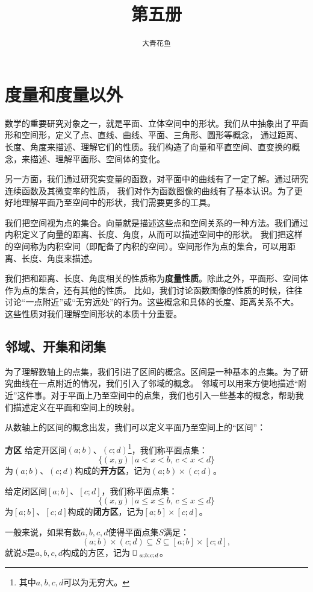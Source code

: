 \documentclass[12pt,UTF8]{ctexbook}
\title{\zihao{0} \bfseries 第五册}
\author{\zihao{2} \texttt{大青花鱼}}
\date{}
\begin{document}
\maketitle
\tableofcontents
\newpage

\chapter{度量和度量以外}

数学的重要研究对象之一，就是平面、立体空间中的形状。我们从中抽象出了平面形和空间形，定义了点、直线、曲线、平面、三角形、圆形等概念，
通过距离、长度、角度来描述、理解它们的性质。我们构造了向量和平直空间、直变换的概念，来描述、理解平面形、空间体的变化。

另一方面，我们通过研究实变量的函数，对平面中的曲线有了一定了解。通过研究连续函数及其微变率的性质，
我们对作为函数图像的曲线有了基本认识。为了更好地理解平面乃至空间中的形状，我们需要更多的工具。

我们把空间视为点的集合。向量就是描述这些点和空间关系的一种方法。我们通过内积定义了向量的距离、长度、角度，从而可以描述空间中的形状。
我们把这样的空间称为内积空间（即配备了内积的空间）。空间形作为点的集合，可以用距离、长度、角度来描述。

我们把和距离、长度、角度相关的性质称为\textbf{度量性质}。除此之外，平面形、空间体作为点的集合，还有其他的性质。
比如，我们讨论函数图像的性质的时候，往往讨论“一点附近”或“无穷远处”的行为。这些概念和具体的长度、距离关系不大。
这些性质对我们理解空间形状的本质十分重要。

\section{邻域、开集和闭集}

为了理解数轴上的点集，我们引进了区间的概念。区间是一种基本的点集。为了研究曲线在一点附近的情况，我们引入了邻域的概念。
邻域可以用来方便地描述“附近”这件事。对于平面上乃至空间中的点集，我们也引入一些基本的概念，帮助我们描述定义在平面和空间上的映射。

从数轴上的区间的概念出发，我们可以定义平面乃至空间上的“区间”：

\begin{df}{\textbf{方区}}
    给定开区间$(a;b)$、$(c;d)$\footnote{其中$a,b,c,d$可以为无穷大。}，我们称平面点集：
    $$\{(x, y) \, | \, a < x < b,\, c< x < d\}$$
    为$(a;b)$、$(c;d)$构成的\textbf{开方区}，记为$(a;b)\times(c;d)$。

    给定闭区间$[a;b]$、$[c;d]$，我们称平面点集：
    $$\{(x, y) \, | \, a \leqslant x \leqslant b,\, c \leqslant x \leqslant d\}$$
    为$[a;b]$、$[c;d]$构成的\textbf{闭方区}，记为$[a;b]\times[c;d]$。

    一般来说，如果有数$a,b,c,d$使得平面点集$S$满足：
    $$(a;b)\times(c;d) \subseteq S \subseteq [a;b]\times[c;d],$$
    就说$S$是$a,b,c,d$构成的方区，记为$\rectbx_{a;b;c;d}$。

\end{df}
\end{document}
